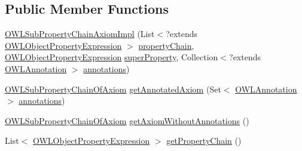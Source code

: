 \subsection*{Public Member Functions}
\begin{DoxyCompactItemize}
\item 
\hyperlink{classuk_1_1ac_1_1manchester_1_1cs_1_1owl_1_1owlapi_1_1_o_w_l_sub_property_chain_axiom_impl_a92bc51450185800634a2d3f4d8efbff3}{O\-W\-L\-Sub\-Property\-Chain\-Axiom\-Impl} (List$<$?extends \hyperlink{interfaceorg_1_1semanticweb_1_1owlapi_1_1model_1_1_o_w_l_object_property_expression}{O\-W\-L\-Object\-Property\-Expression} $>$ \hyperlink{classuk_1_1ac_1_1manchester_1_1cs_1_1owl_1_1owlapi_1_1_o_w_l_sub_property_chain_axiom_impl_a2e9cd38ade9b321092820d5e01383020}{property\-Chain}, \hyperlink{interfaceorg_1_1semanticweb_1_1owlapi_1_1model_1_1_o_w_l_object_property_expression}{O\-W\-L\-Object\-Property\-Expression} \hyperlink{classuk_1_1ac_1_1manchester_1_1cs_1_1owl_1_1owlapi_1_1_o_w_l_sub_property_chain_axiom_impl_a177b627a8ebbddd97ed06d369bf69bff}{super\-Property}, Collection$<$?extends \hyperlink{interfaceorg_1_1semanticweb_1_1owlapi_1_1model_1_1_o_w_l_annotation}{O\-W\-L\-Annotation} $>$ \hyperlink{classuk_1_1ac_1_1manchester_1_1cs_1_1owl_1_1owlapi_1_1_o_w_l_axiom_impl_af6fbf6188f7bdcdc6bef5766feed695e}{annotations})
\item 
\hyperlink{interfaceorg_1_1semanticweb_1_1owlapi_1_1model_1_1_o_w_l_sub_property_chain_of_axiom}{O\-W\-L\-Sub\-Property\-Chain\-Of\-Axiom} \hyperlink{classuk_1_1ac_1_1manchester_1_1cs_1_1owl_1_1owlapi_1_1_o_w_l_sub_property_chain_axiom_impl_a0f00c69d1a6dbbdd4ef672dfaa235e87}{get\-Annotated\-Axiom} (Set$<$ \hyperlink{interfaceorg_1_1semanticweb_1_1owlapi_1_1model_1_1_o_w_l_annotation}{O\-W\-L\-Annotation} $>$ \hyperlink{classuk_1_1ac_1_1manchester_1_1cs_1_1owl_1_1owlapi_1_1_o_w_l_axiom_impl_af6fbf6188f7bdcdc6bef5766feed695e}{annotations})
\item 
\hyperlink{interfaceorg_1_1semanticweb_1_1owlapi_1_1model_1_1_o_w_l_sub_property_chain_of_axiom}{O\-W\-L\-Sub\-Property\-Chain\-Of\-Axiom} \hyperlink{classuk_1_1ac_1_1manchester_1_1cs_1_1owl_1_1owlapi_1_1_o_w_l_sub_property_chain_axiom_impl_a6db7a274b647b82c1f70eec0fec315a2}{get\-Axiom\-Without\-Annotations} ()
\item 
List$<$ \hyperlink{interfaceorg_1_1semanticweb_1_1owlapi_1_1model_1_1_o_w_l_object_property_expression}{O\-W\-L\-Object\-Property\-Expression} $>$ \hyperlink{classuk_1_1ac_1_1manchester_1_1cs_1_1owl_1_1owlapi_1_1_o_w_l_sub_property_chain_axiom_impl_a71874b6acc57de32748e8218f29192d5}{get\-Property\-Chain} ()

\end{DoxyCompactItemize}
